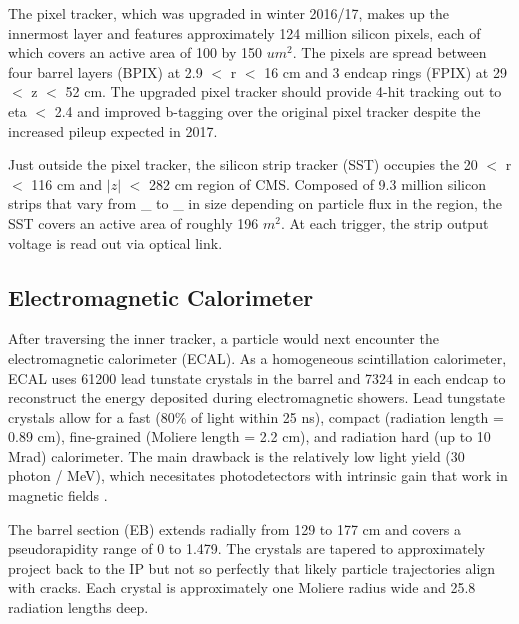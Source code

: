 \documentclass[12pt]{article}
\begin{document}
    The pixel tracker, which was upgraded in winter 2016/17, makes up the innermost layer and features approximately 124 million silicon pixels, each of which covers an active area of 100 by 150 $um^2$. The pixels are spread between four barrel layers (BPIX) at 2.9 $<$ r $<$ 16 cm and 3 endcap rings (FPIX) at 29 $<$ z $<$ 52 cm. The upgraded pixel tracker should provide 4-hit tracking out to eta $<$ 2.4 and improved b-tagging over the original pixel tracker despite the increased pileup expected in 2017.
    
    Just outside the pixel tracker, the silicon strip tracker (SST) occupies the 20 $<$ r $<$ 116 cm and $|z|$ $<$ 282 cm region of CMS. Composed of 9.3 million silicon strips that vary from \_ to \_ in size  depending on particle flux in the region, the SST covers an active area of roughly 196 $m^2$. At each trigger, the strip output voltage is read out via optical link.

\subsection{Electromagnetic Calorimeter}
    After traversing the inner tracker, a particle would next encounter the electromagnetic calorimeter (ECAL). As a homogeneous scintillation calorimeter, ECAL uses 61200 lead tunstate crystals in the barrel and 7324 in each endcap to reconstruct the energy deposited during electromagnetic showers. Lead tungstate crystals allow for a fast (80\% of light within 25 ns), compact (radiation length = 0.89 cm), fine-grained (Moliere length = 2.2 cm), and radiation hard (up to 10 Mrad) calorimeter. The main drawback is the relatively low light yield (30 photon / MeV), which necesitates photodetectors with intrinsic gain that work in magnetic fields . 

    The barrel section (EB) extends radially from 129 to 177  cm and covers a pseudorapidity range of 0 to 1.479. The crystals are tapered to approximately project back to the IP but not so perfectly that likely particle trajectories align with cracks. Each crystal is approximately one Moliere radius wide and 25.8 radiation lengths deep.
\end{document}
